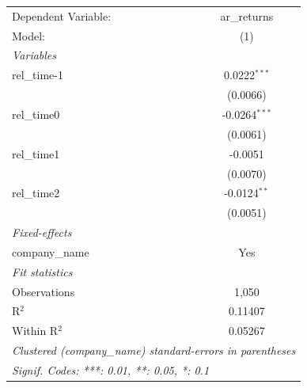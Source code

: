 
\begingroup
\centering
\begin{tabular}{lc}
   \tabularnewline \midrule \midrule
   Dependent Variable: & ar\_returns\\   
   Model:              & (1)\\  
   \midrule
   \emph{Variables}\\
   rel\_time-1         & 0.0222$^{***}$\\   
                       & (0.0066)\\   
   rel\_time0          & -0.0264$^{***}$\\   
                       & (0.0061)\\   
   rel\_time1          & -0.0051\\   
                       & (0.0070)\\   
   rel\_time2          & -0.0124$^{**}$\\   
                       & (0.0051)\\   
   \midrule
   \emph{Fixed-effects}\\
   company\_name       & Yes\\  
   \midrule
   \emph{Fit statistics}\\
   Observations        & 1,050\\  
   R$^2$               & 0.11407\\  
   Within R$^2$        & 0.05267\\  
   \midrule \midrule
   \multicolumn{2}{l}{\emph{Clustered (company\_name) standard-errors in parentheses}}\\
   \multicolumn{2}{l}{\emph{Signif. Codes: ***: 0.01, **: 0.05, *: 0.1}}\\
\end{tabular}
\par\endgroup


